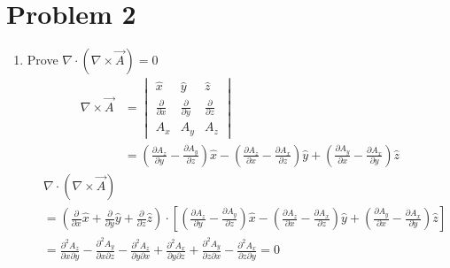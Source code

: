 \documentclass[12pt]{article}
\begin{document}
\section*{Problem 2}
\begin{enumerate}
	\item Prove \(\nabla \cdot (\nabla \times \vec{A}) = 0 \)
	      \begin{align*}
		      \nabla \times \vec{A} & = \begin{vmatrix}
			                                \hat{x}                     & \hat{y}                     & \hat{z}                     \\
			                                \frac{\partial}{\partial x} & \frac{\partial}{\partial y} & \frac{\partial}{\partial z} \\
			                                A_x                         & A_y                         & A_z
		                                \end{vmatrix}                                                                                                                                                                                 \\
		                            & = \left(\frac{\partial A_z}{\partial y} -\frac{\partial A_y}{\partial z}\right) \hat{x} - \left(\frac{\partial A_z}{\partial x} - \frac{\partial A_x}{\partial z}\right) \hat{y} + \left(\frac{\partial A_y}{\partial x} - \frac{\partial A_x}{\partial y}\right) \hat{z}
	      \end{align*}
	      \begin{align*}
		       & \nabla \cdot (\nabla \times \vec{A})                                                                                                                                                                                                                                                          \\
		       & = \left(\frac{\partial}{\partial x} \hat{x} + \frac{\partial}{\partial y}\hat{y} + \frac{\partial}{\partial z} \hat{z}\right) \cdot
		      \left[\left(\frac{\partial A_z}{\partial y} -\frac{\partial A_y}{\partial z}\right) \hat{x} - \left(\frac{\partial A_z}{\partial x} - \frac{\partial A_x}{\partial z}\right) \hat{y} + \left(\frac{\partial A_y}{\partial x} - \frac{\partial A_x}{\partial y}\right) \hat{z}\right]             \\
		       & = \frac{\partial^2 A_z}{\partial x \partial y} - \frac{\partial^2 A_y}{\partial x \partial z} - \frac{\partial^2 A_z}{\partial y \partial x} + \frac{\partial^2 A_x}{\partial y \partial z} + \frac{\partial^2 A_y}{\partial z \partial x} - \frac{\partial^2 A_x}{\partial z \partial y} = 0 \\

\end{align*}
\end{enumerate}
\end{document}

